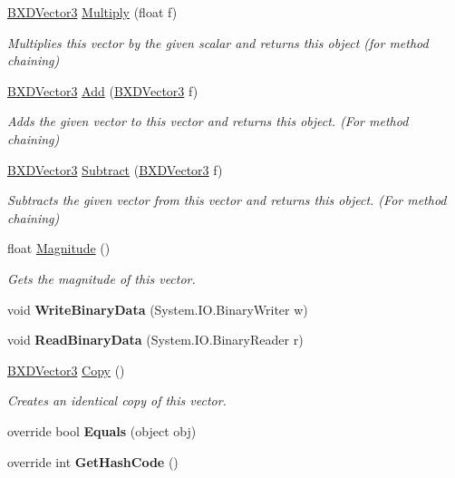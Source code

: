 \begin{DoxyCompactItemize}
\hyperlink{class_b_x_d_vector3}{B\+X\+D\+Vector3} \hyperlink{class_b_x_d_vector3_a4fa123abdf042e9116c3c231b61c8668}{Multiply} (float f)
\begin{DoxyCompactList}\small\item\em Multiplies this vector by the given scalar and returns this object (for method chaining) \end{DoxyCompactList}\item 
\hyperlink{class_b_x_d_vector3}{B\+X\+D\+Vector3} \hyperlink{class_b_x_d_vector3_a06be557b2f4f8a78b4fa30c766756264}{Add} (\hyperlink{class_b_x_d_vector3}{B\+X\+D\+Vector3} f)
\begin{DoxyCompactList}\small\item\em Adds the given vector to this vector and returns this object. (For method chaining) \end{DoxyCompactList}\item 
\hyperlink{class_b_x_d_vector3}{B\+X\+D\+Vector3} \hyperlink{class_b_x_d_vector3_abe5605287cb9f1fde60e6c1f4f3c0245}{Subtract} (\hyperlink{class_b_x_d_vector3}{B\+X\+D\+Vector3} f)
\begin{DoxyCompactList}\small\item\em Subtracts the given vector from this vector and returns this object. (For method chaining) \end{DoxyCompactList}\item 
float \hyperlink{class_b_x_d_vector3_a3db16bd642a330d6ba53175aadcf28bd}{Magnitude} ()
\begin{DoxyCompactList}\small\item\em Gets the magnitude of this vector. \end{DoxyCompactList}\item 
\mbox{\label{class_b_x_d_vector3_ae6eaf3260e01b57245209f6452f28b16}} 
void {\bfseries Write\+Binary\+Data} (System.\+I\+O.\+Binary\+Writer w)
\item 
\mbox{\label{class_b_x_d_vector3_a45b7d22842548db663319beb37f64b75}} 
void {\bfseries Read\+Binary\+Data} (System.\+I\+O.\+Binary\+Reader r)
\item 
\hyperlink{class_b_x_d_vector3}{B\+X\+D\+Vector3} \hyperlink{class_b_x_d_vector3_ab598b771db0c6a5e5a3e497ed4d9dfda}{Copy} ()
\begin{DoxyCompactList}\small\item\em Creates an identical copy of this vector. \end{DoxyCompactList}\item 
\mbox{\label{class_b_x_d_vector3_aa7d53340156ece70489a4cb1b6fb879c}} 
override bool {\bfseries Equals} (object obj)
\item 
\mbox{\label{class_b_x_d_vector3_adbbef15423b860b5f74264c970736892}} 
override int {\bfseries Get\+Hash\+Code} ()
\end{DoxyCompactItemize}
